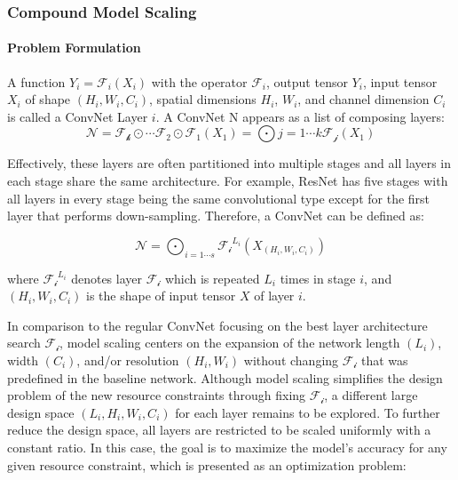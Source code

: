 \documentclass[
]{krantz}
\begin{document}
\hypertarget{compound-model-scaling}{%
\subsubsection{Compound Model Scaling}\label{compound-model-scaling}}

\hypertarget{problem-formulation}{%
\paragraph{Problem Formulation}\label{problem-formulation}}

A function \(Y_i = \mathcal{F}_i \left( X_i \right)\) with the operator \(\mathcal{F}_i\), output tensor \(Y_i\), input tensor \(X_i\) of shape \(\left( H_i, W_i, C_i \right)\), spatial dimensions \(H_i\), \(W_i\), and channel dimension \(C_i\) is called a ConvNet Layer \(i\). A ConvNet N appears as a list of composing layers:
\[
\mathcal{N}=\mathcal{F_k}\odot \cdots \mathcal{F_2}\odot\mathcal{F_1}\left( X_1 \right)=\bigodot{j=1\cdots k}\mathcal{F_j}\left( X_1 \right)
\]

Effectively, these layers are often partitioned into multiple stages and all layers in each stage share the same architecture. For example, ResNet has five stages with all layers in every stage being the same convolutional type except for the first layer that performs down-sampling. Therefore, a ConvNet can be defined as:

\[
\mathcal{N}=\bigodot_{i=1\cdots s}\mathcal{F_i}^{L_i}\left( X_{\left( H_i, W_i, C_i  \right)} \right)
\]

where \(\mathcal{F_i}^{L_i}\) denotes layer \(\mathcal{F_i}\) which is repeated \(L_i\) times in stage \(i\), and \(\left( H_i, W_i, C_i \right)\) is the shape of input tensor \(X\) of layer \(i\).

In comparison to the regular ConvNet focusing on the best layer architecture search \(\mathcal{F_i}\), model scaling centers on the expansion of the network length \(\left( L_i\right)\), width \(\left( C_i \right)\), and/or resolution \(\left( H_i, W_i\right)\) without changing \(\mathcal{F_i}\) that was predefined in the baseline network. Although model scaling simplifies the design problem of the new resource constraints through fixing \(\mathcal{F_i}\), a different large design space \(\left( L_i, H_i, W_i, C_i \right)\) for each layer remains to be explored. To further reduce the design space, all layers are restricted to be scaled uniformly with a constant ratio. In this case, the goal is to maximize the model's accuracy for any given resource constraint, which is presented as an optimization problem:
\end{document}
